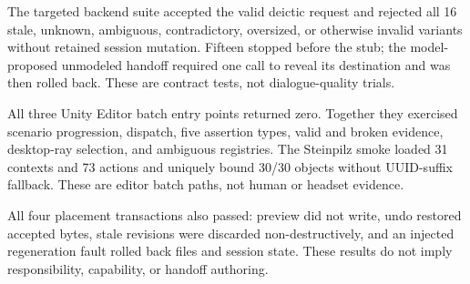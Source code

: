 The targeted backend suite accepted the valid deictic request and rejected all
16 stale, unknown, ambiguous, contradictory, oversized, or otherwise invalid
variants without retained session mutation. Fifteen stopped before the stub;
the model-proposed unmodeled handoff required one call to reveal its destination
and was then rolled back. These are contract tests, not dialogue-quality trials.

All three Unity Editor batch entry points returned zero. Together they exercised
scenario progression, dispatch, five assertion types, valid and broken evidence,
desktop-ray selection, and ambiguous registries. The Steinpilz smoke loaded 31
contexts and 73 actions and uniquely bound 30/30 objects without UUID-suffix
fallback. These are editor batch paths, not human or headset evidence.

All four placement transactions also passed: preview did not write, undo
restored accepted bytes, stale revisions were discarded non-destructively, and
an injected regeneration fault rolled back files and session state. These
results do not imply responsibility, capability, or handoff authoring.
